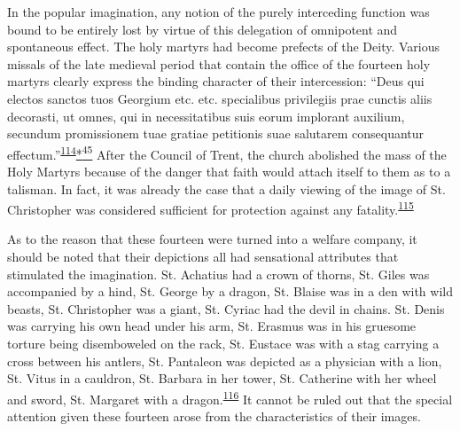 In the popular imagination, any notion of the purely interceding
function was bound to be entirely lost by virtue of this delegation of
\protect\hypertarget{13_Chapter_Six__THE_DEPICTION_OF_TH.xhtmlux5cux23page_198}{}{}omnipotent
and spontaneous effect. The holy martyrs had become prefects of the
Deity. Various missals of the late medieval period that contain the
office of the fourteen holy martyrs clearly express the binding
character of their intercession: ``Deus qui electos sanctos tuos
Georgium etc. etc. specialibus privilegiis prae cunctis aliis decorasti,
ut omnes, qui in necessitatibus suis eorum implorant auxilium, secundum
promissionem tuae gratiae petitionis suae salutarem consequantur
effectum.''\textsuperscript{\protect\hypertarget{13_Chapter_Six__THE_DEPICTION_OF_TH.xhtmlux5cux23id_1045}{\protect\hyperlink{23_NOTES.xhtmlux5cux23id_1046}{114}}}\protect\hypertarget{13_Chapter_Six__THE_DEPICTION_OF_TH.xhtmlux5cux23id_3065}{\protect\hyperlink{23_NOTES.xhtmlux5cux23id_3066}{*\textsuperscript{45}}}
After the Council of Trent, the church abolished the mass of the Holy
Martyrs because of the danger that faith would attach itself to them as
to a talisman. In fact, it was already the case that a daily viewing of
the image of St. Christopher was considered sufficient for protection
against any
fatality.\textsuperscript{\protect\hypertarget{13_Chapter_Six__THE_DEPICTION_OF_TH.xhtmlux5cux23id_1043}{\protect\hyperlink{23_NOTES.xhtmlux5cux23id_1044}{115}}}

As to the reason that these fourteen were turned into a welfare company,
it should be noted that their depictions all had sensational attributes
that stimulated the imagination. St. Achatius had a crown of thorns, St.
Giles was accompanied by a hind, St. George by a dragon, St. Blaise was
in a den with wild beasts, St. Christopher was a giant, St. Cyriac had
the devil in chains. St. Denis was carrying his own head under his arm,
St. Erasmus was in his gruesome torture being disemboweled on the rack,
St. Eustace was with a stag carrying a cross between his antlers, St.
Pantaleon was depicted as a physician with a lion, St. Vitus in a
cauldron, St. Barbara in her tower, St. Catherine with her wheel and
sword, St. Margaret with a
dragon.\textsuperscript{\protect\hypertarget{13_Chapter_Six__THE_DEPICTION_OF_TH.xhtmlux5cux23id_1041}{\protect\hyperlink{23_NOTES.xhtmlux5cux23id_1042}{116}}}
It cannot be ruled out that the special attention given these fourteen
arose from the characteristics of their images.

